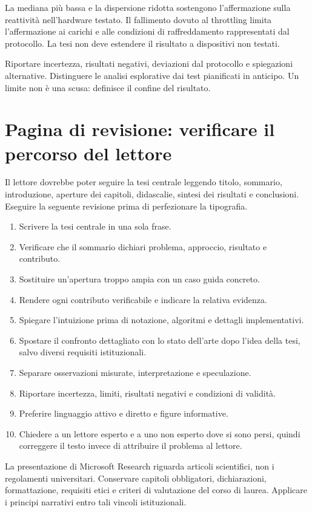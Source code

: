 \begin{keypoint}[Interpretazione]
La mediana più bassa e la dispersione ridotta sostengono l'affermazione sulla
reattività nell'hardware testato. Il fallimento dovuto al throttling limita
l'affermazione ai carichi e alle condizioni di raffreddamento rappresentati dal
protocollo. La tesi non deve estendere il risultato a dispositivi non testati.
\end{keypoint}

Riportare incertezza, risultati negativi, deviazioni dal protocollo e
spiegazioni alternative. Distinguere le analisi esplorative dai test pianificati
in anticipo. Un limite non è una scusa: definisce il confine del risultato.

\clearpage
\section{Pagina di revisione: verificare il percorso del lettore}
Il lettore dovrebbe poter seguire la tesi centrale leggendo titolo, sommario,
introduzione, aperture dei capitoli, didascalie, sintesi dei risultati e
conclusioni. Eseguire la seguente revisione prima di perfezionare la tipografia.

\begin{enumerate}
  \item Scrivere la tesi centrale in una sola frase.
  \item Verificare che il sommario dichiari problema, approccio, risultato e contributo.
  \item Sostituire un'apertura troppo ampia con un caso guida concreto.
  \item Rendere ogni contributo verificabile e indicare la relativa evidenza.
  \item Spiegare l'intuizione prima di notazione, algoritmi e dettagli implementativi.
  \item Spostare il confronto dettagliato con lo stato dell'arte dopo l'idea della
        tesi, salvo diversi requisiti istituzionali.
  \item Separare osservazioni misurate, interpretazione e speculazione.
  \item Riportare incertezza, limiti, risultati negativi e condizioni di validità.
  \item Preferire linguaggio attivo e diretto e figure informative.
  \item Chiedere a un lettore esperto e a uno non esperto dove si sono persi,
        quindi correggere il testo invece di attribuire il problema al lettore.
\end{enumerate}

\begin{keypoint}
La presentazione di Microsoft Research riguarda articoli scientifici, non i
regolamenti universitari. Conservare capitoli obbligatori, dichiarazioni,
formattazione, requisiti etici e criteri di valutazione del corso di laurea.
Applicare i principi narrativi entro tali vincoli istituzionali.
\end{keypoint}
